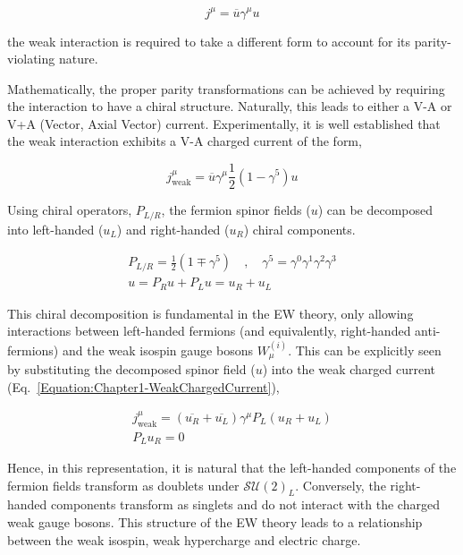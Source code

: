 \begin{equation}
    j^\mu = \overline{u}\gamma^\mu u
\end{equation}

the weak interaction is required to take a different form to account for its parity-violating nature.

Mathematically, the proper parity transformations can be achieved by requiring the interaction to have a chiral structure. Naturally, this leads to either a V-A or V+A (Vector, Axial Vector) current. Experimentally, it is well established that the weak interaction exhibits a V-A charged current of the form,

\begin{equation}
    j^\mu_{\text{weak}} = \overline{u}\gamma^\mu \frac{1}{2}(1-\gamma^5)u
\label{Equation:Chapter1-WeakChargedCurrent}
\end{equation}

Using chiral operators, $P_{L/R}$, the fermion spinor fields ($u$) can be decomposed into left-handed ($u_{L}$) and right-handed ($u_{R}$) chiral components. 

\begin{equation}
\begin{array}{c}
    P_{L/R} = \frac{1}{2}(1\mp \gamma^5) \quad ,\quad \gamma^5 = \gamma^0\gamma^1\gamma^2\gamma^3 \\
    u = P_Ru +P_Lu = u_R + u_L
\end{array}
\end{equation}

This chiral decomposition is fundamental in the EW theory, only allowing interactions between left-handed fermions (and equivalently, right-handed anti-fermions) and the weak isospin gauge bosons $W_{\mu}^{(i)}$. This can be explicitly seen by substituting the decomposed spinor field ($u$) into the weak charged current (Eq.~\ref{Equation:Chapter1-WeakChargedCurrent}),

\begin{equation}
\begin{array}{c}
    j^\mu_{\text{weak}} = (\overline{u_R} + \overline{u_L})\gamma^\mu P_L (u_R+u_L) \\
    P_L u_R = 0
\label{Equation:Chapter1-WeakChargedCurrent_Decomposed}
\end{array}
\end{equation}

Hence, in this representation, it is natural that the left-handed components of the fermion fields transform as doublets under $\mathcal{SU}(2)_L$. Conversely, the right-handed components transform as singlets and do not interact with the charged weak gauge bosons. This structure of the EW theory leads to a relationship between the weak isospin, weak hypercharge and electric charge.

